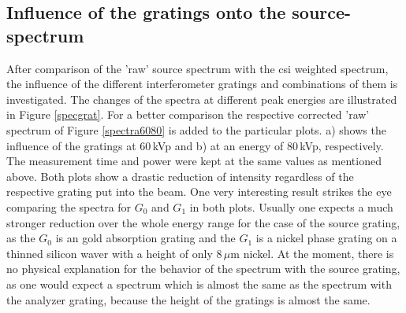 \subsection{Influence of the gratings onto the source-spectrum}\label{subsec:gratspec}
After comparison of the 'raw' source spectrum with the \gls{csi} weighted spectrum, the influence of the different interferometer gratings and combinations of them is investigated. The changes of the spectra at different peak energies are illustrated in Figure \ref{specgrat}. For a better comparison the respective corrected 'raw' spectrum of Figure \ref{spectra6080} is added to the particular plots. a) shows the influence of the gratings at $60\,$kVp and b) at an energy of $80\,$kVp, respectively. The measurement time and power were kept at the same values as mentioned above. Both plots show a drastic reduction of intensity regardless of the respective grating put into the beam. One very interesting result strikes the eye comparing the spectra for $G_{0}$ and $G_{1}$ in both plots. Usually one expects a much stronger reduction over the whole energy range for the case of the source grating, as the $G_{0}$ is an gold absorption grating and the $G_{1}$ is a nickel phase grating on a thinned silicon waver with a height of only $8\, \mu$m nickel. At the moment, there is no physical explanation for the behavior of the spectrum with the source grating, as one would expect a spectrum which is almost the same as the spectrum with the analyzer grating, because the height of the gratings is almost the same. 
